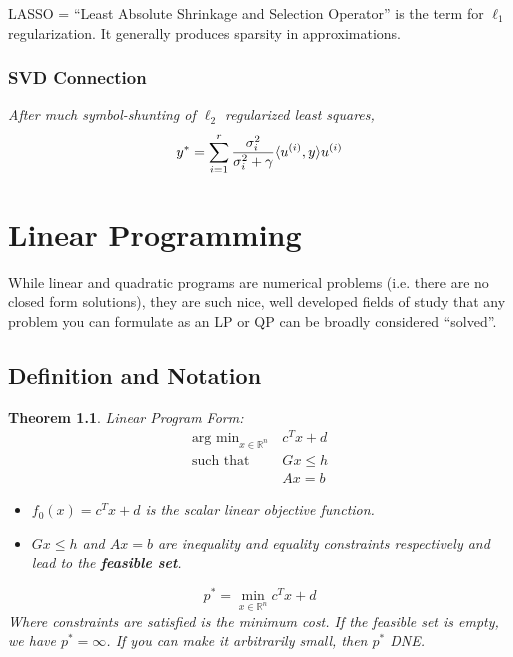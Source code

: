 \documentclass[a4paper,12pt]{report}
\DeclarePairedDelimiter\inpr{\langle}{\rangle}%
\newtheorem{theorem}{Theorem}
\begin{document}
LASSO = ``Least Absolute Shrinkage and Selection Operator'' is the term for $\ell_1$ regularization. It generally produces sparsity in approximations.

\subsection{SVD Connection}

\textit{After much symbol-shunting of $\ell_2$ regularized least squares,} 
\begin{equation}
y^* = \sum_{i=1}^{r} \frac{\sigma_i^2}{\sigma_i^2 + \gamma} \inpr{u^{(i)}, y} u^{(i)}
\end{equation}




\chapter{Linear Programming}

While linear and quadratic programs are numerical problems (i.e. there are no closed form solutions), they are such nice, well developed fields of study that any problem you can formulate as an LP or QP can be broadly considered ``solved''.

\section{Definition and Notation}

\begin{theorem}{Linear Program Form: }
\begin{align}
\text{arg min}_{x\in \mathbb{R}^n} \,& c^T x + d \\
\text{such that } & Gx \leq h \\
& Ax = b
\end{align}
\begin{itemize}
\item $f_0(x) = c^T x + d$ is the scalar linear objective function.
\item $Gx \leq h$ and $Ax = b$ are inequality and equality constraints respectively and lead to the \textbf{feasible set}.
\end{itemize}
\begin{equation}
p^* = \min_{x\in \mathbb{R}^n} c^T x + d
\end{equation}
Where constraints are satisfied is the minimum cost. If the feasible set is empty, we have $p^* = \infty$. If you can make it arbitrarily small, then $p^*$ DNE. 
\end{theorem}
\end{document}
